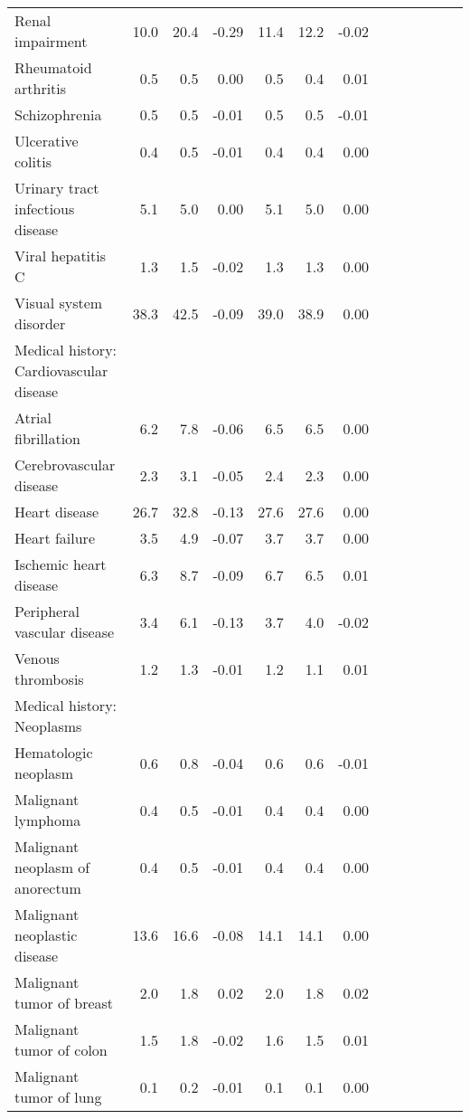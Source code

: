 \documentclass[11pt,]{article}
\begin{document}
\begin{longtable}{lrrrrrrrrrrrr}
      Renal impairment & 10.0 &  20.4 & -0.29 & 11.4 &  12.2 & -0.02 \\ 
      Rheumatoid arthritis &  0.5 &   0.5 &  0.00 &  0.5 &   0.4 &  0.01 \\ 
      Schizophrenia &  0.5 &   0.5 & -0.01 &  0.5 &   0.5 & -0.01 \\ 
      Ulcerative colitis &  0.4 &   0.5 & -0.01 &  0.4 &   0.4 &  0.00 \\ 
      Urinary tract infectious disease &  5.1 &   5.0 &  0.00 &  5.1 &   5.0 &  0.00 \\ 
      Viral hepatitis C &  1.3 &   1.5 & -0.02 &  1.3 &   1.3 &  0.00 \\ 
      Visual system disorder & 38.3 &  42.5 & -0.09 & 39.0 &  38.9 &  0.00 \\ 
  Medical history: Cardiovascular disease &    &     &     &    &     &     \\ 
      Atrial fibrillation &  6.2 &   7.8 & -0.06 &  6.5 &   6.5 &  0.00 \\ 
      Cerebrovascular disease &  2.3 &   3.1 & -0.05 &  2.4 &   2.3 &  0.00 \\ 
      Heart disease & 26.7 &  32.8 & -0.13 & 27.6 &  27.6 &  0.00 \\ 
      Heart failure &  3.5 &   4.9 & -0.07 &  3.7 &   3.7 &  0.00 \\ 
      Ischemic heart disease &  6.3 &   8.7 & -0.09 &  6.7 &   6.5 &  0.01 \\ 
      Peripheral vascular disease &  3.4 &   6.1 & -0.13 &  3.7 &   4.0 & -0.02 \\ 
      Venous thrombosis &  1.2 &   1.3 & -0.01 &  1.2 &   1.1 &  0.01 \\ 
  Medical history: Neoplasms &    &     &     &    &     &     \\ 
      Hematologic neoplasm &  0.6 &   0.8 & -0.04 &  0.6 &   0.6 & -0.01 \\ 
      Malignant lymphoma &  0.4 &   0.5 & -0.01 &  0.4 &   0.4 &  0.00 \\ 
      Malignant neoplasm of anorectum &  0.4 &   0.5 & -0.01 &  0.4 &   0.4 &  0.00 \\ 
      Malignant neoplastic disease & 13.6 &  16.6 & -0.08 & 14.1 &  14.1 &  0.00 \\ 
      Malignant tumor of breast &  2.0 &   1.8 &  0.02 &  2.0 &   1.8 &  0.02 \\ 
      Malignant tumor of colon &  1.5 &   1.8 & -0.02 &  1.6 &   1.5 &  0.01 \\ 
      Malignant tumor of lung &  0.1 &   0.2 & -0.01 &  0.1 &   0.1 &  0.00 \\ 

\end{longtable}
\end{document}
